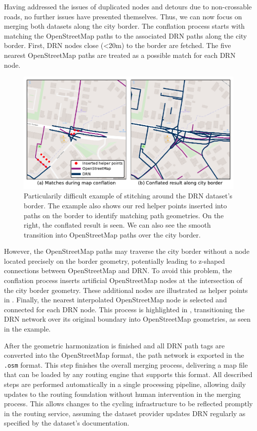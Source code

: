 Having addressed the issues of duplicated nodes and detours due to non-crossable roads, no further issues have presented themselves. Thus, we can now focus on merging both datasets along the city border. The conflation process starts with matching the OpenStreetMap paths to the associated DRN paths along the city border. First, DRN nodes close (<20m) to the border are fetched. The five nearest OpenStreetMap paths are treated as a possible match for each DRN node. 

\begin{figure}[t]
\centering
\includegraphics[width=\linewidth]{images/routing-drn-osm-border.pdf}
\caption{Particularily difficult example of stitching around the DRN dataset's border. The example also shows our red helper points inserted into paths on the border to identify matching path geometries. On the right, the conflated result is seen. We can also see the smooth transition into OpenStreetMap paths over the city border.}
\label{fig:routing-drn-osm-border}
\end{figure}

However, the OpenStreetMap paths may traverse the city border without a node located precisely on the border geometry, potentially leading to z-shaped connections between OpenStreetMap and DRN. To avoid this problem, the conflation process inserts artificial OpenStreetMap nodes at the intersection of the city border geometry. These additional nodes are illustrated as helper points in . Finally, the nearest interpolated OpenStreetMap node is selected and connected for each DRN node. This process is highlighted in , transitioning the DRN network over its original boundary into OpenStreetMap geometries, as seen in the example.

After the geometric harmonization is finished and all DRN path tags are converted into the OpenStreetMap format, the path network is exported in the \texttt{.osm} format. This step finishes the overall merging process, delivering a map file that can be loaded by any routing engine that supports this format. All described steps are performed automatically in a single processing pipeline, allowing daily updates to the routing foundation without human intervention in the merging process. This allows changes to the cycling infrastructure to be reflected promptly in the routing service, assuming the dataset provider updates DRN regularly as specified by the dataset's documentation. 

